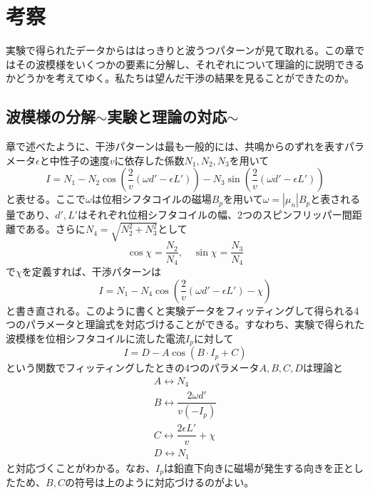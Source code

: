\section{考察}
実験で得られたデータからははっきりと波うつパターンが見て取れる。この章ではその波模様をいくつかの要素に分解し、それぞれについて理論的に説明できるかどうかを考えてゆく。私たちは望んだ干渉の結果を見ることができたのか。

\subsection{波模様の分解$\sim$実験と理論の対応$\sim$}

章で述べたように、干渉パターンは最も一般的には、共鳴からのずれを表すパラメータ$\epsilon$と中性子の速度$v$に依存した係数$N_1,N_2,N_3$を用いて
\begin{equation}
I=N_1-N_2\cos\left(\frac{2}{v}(\omega d'-\epsilon L')\right) -N_3\sin\left(\frac{2}{v}(\omega d'-\epsilon L')\right)
\end{equation}
と表せる。ここで$\omega$は位相シフタコイルの磁場$B_p$を用いて$\omega=|\mu_n|B_p$と表される量であり、$d',L'$はそれぞれ位相シフタコイルの幅、2つのスピンフリッパー間距離である。さらに$N_4=\sqrt{N_2^2+N_3^2}$として
\begin{equation}
\cos \chi=\frac{N_2}{N_4}, \quad \sin \chi=\frac{N_3}{N_4}
\end{equation}
で$\chi$を定義すれば、干渉パターンは
\begin{equation}
I=N_1-N_4\cos\left(\frac{2}{v}(\omega d'-\epsilon L')-\chi\right)
\end{equation}
と書き直される。このように書くと実験データをフィッティングして得られる4つのパラメータと理論式を対応づけることができる。すなわち、実験で得られた波模様を位相シフタコイルに流した電流$I_p$に対して
\begin{equation}
I=D-A\cos(B\cdot I_p+C)
\end{equation}
という関数でフィッティングしたときの4つのパラメータ$A,B,C,D$は理論と
\renewcommand{\arraystretch}{1.5}
\begin{equation}
\begin{array}{l}
A \leftrightarrow N_4\\
B \leftrightarrow \dfrac{2\omega d'}{v(-I_p)}\\
C \leftrightarrow \dfrac{2\epsilon L'}{v} +\chi \\
D \leftrightarrow N_1
\end{array}
\end{equation}
\renewcommand{\arraystretch}{1}
と対応づくことがわかる。なお、$I_p$は鉛直下向きに磁場が発生する向きを正としたため、$B,C$の符号は上のように対応づけるのがよい。

